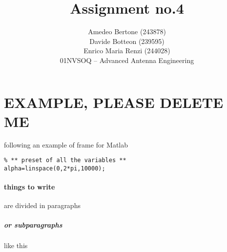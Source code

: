 \documentclass[11pt,a4paper,twoside,openright]{article}
\begin{document}
\title{Assignment no.4}
\author{Amedeo Bertone (243878)\\Davide Botteon (239595)\\Enrico Maria Renzi (244028)\\
	01NVSOQ -- Advanced Antenna Engineering}
\maketitle






\section{EXAMPLE, PLEASE DELETE ME}
following an example of frame for Matlab
\begin{lstlisting}
% ** preset of all the variables **
alpha=linspace(0,2*pi,10000);
\end{lstlisting}
\paragraph{things to write} are divided in paragraphs
\subparagraph{or subparagraphs} like this
\end{document}
